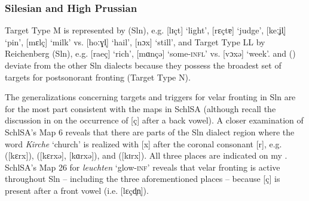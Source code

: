 \subsubsection{Silesian and High Prussian}
Target Type M is represented by  (Sln), e.g. [lɪçt] ‘light’, [rɛçtɐ] ‘judge’, [keːʝl̩] ‘pin’, [mɛlç] ‘milk’ vs. [hoːɣl̩] ‘hail’, [nɔx] ‘still’, and Target Type LL by Reichenberg (Sln), e.g. [raeç] ‘rich’, [mɑnçə] ‘some\textsc{{}-infl}’ vs. [vɔxə] ‘week’.  and  () deviate from the other Sln dialects because they possess the broadest set of targets for postsonorant fronting (Target Type N).

The generalizations concerning targets and triggers for velar fronting in Sln are for the most part consistent with the maps in SchlSA (although recall the discussion in  on the occurrence of [ç] after a back vowel). A closer examination of  SchlSA’s Map 6 reveals that there are parts of the Sln dialect region where the word \textit{Kirche} ‘church’ is realized with [x] after the coronal consonant [r], e.g.  ([kɛrx]),  ([kɛrxə], [kɑrxə]), and  ([kɪrx]). All three places are indicated on my . SchlSA’s Map 26 for \textit{leuchten} ‘glow-\textsc{inf}’ reveals that velar fronting is active throughout Sln -- including the three aforementioned places -- because [ç] is present after a front vowel (i.e. [lɛçd̥n̩]).

